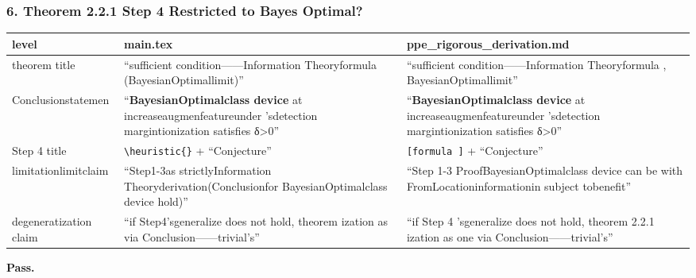 \documentclass[
  12pt,
]{article}
\begin{document}
\subsubsection{6. Theorem 2.2.1 Step 4
Restricted to Bayes Optimal?}\label{ux5b9aux7406-2.2.1-ux6b65ux9aa4-4-ux662fux5426ux5df2ux9650ux5b9aux4e3aux8d1dux53f6ux65afux6700ux4f18}

\begin{longtable}[]{@{}
  >{\raggedright\arraybackslash}p{}
  >{\raggedright\arraybackslash}p{}
  >{\raggedright\arraybackslash}p{}@{}}
\toprule\noalign{}
\begin{minipage}[b]{\linewidth}\raggedright
level 
\end{minipage} & \begin{minipage}[b]{\linewidth}\raggedright
main.tex
\end{minipage} & \begin{minipage}[b]{\linewidth}\raggedright
ppe\_rigorous\_derivation.md
\end{minipage} \\
\midrule\noalign{}
\endhead
\bottomrule\noalign{}
\endlastfoot
theorem title  & ``sufficient condition------Information Theoryformula (BayesianOptimallimit)'' &
``sufficient condition------Information Theoryformula , BayesianOptimallimit'' \\
Conclusionstatemen  & ``\textbf{BayesianOptimalclass device }at increaseaugmenfeatureunder 'sdetection margintionization satisfies 
δ\textgreater0'' &
``\textbf{BayesianOptimalclass device }at increaseaugmenfeatureunder 'sdetection margintionization satisfies 
δ\textgreater0'' \\
Step 4 title  & \texttt{\textbackslash{}heuristic\{\}} + ``Conjecture'' &
\texttt{{[}formula {]}} + ``Conjecture'' \\
limitationlimitclaim  & ``Step1-3as strictlyInformation Theoryderivation(Conclusionfor BayesianOptimalclass device hold)'' &
``Step 1-3 ProofBayesianOptimalclass device can be with FromLocationinformationin subject tobenefit'' \\
degeneratization claim  & ``if Step4'sgeneralize does not hold, theorem ization as via Conclusion------trivial's'' &
``if Step 4 'sgeneralize does not hold, theorem  2.2.1 ization as one via Conclusion------trivial's'' \\
\end{longtable}

\textbf{Pass.}
\end{document}
